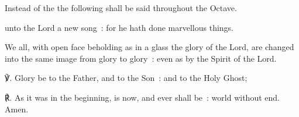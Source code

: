 \mattins

\vspace{-1\baselineskip}

\label{CantateDomino}
{\begin{rubric}
    Instead of the  the following shall be said throughout the Octave.
\end{rubric}}

 unto the Lord a new song~: for he hath done marvellous things. 



We all, with open face beholding as in a glass the glory of the Lord, are changed into the same image from glory to glory~: even as by the Spirit of the Lord. 

℣. Glory be to the Father, and to the Son~: and to the Holy Ghost;\par
℟. As it was in the beginning, is now, and ever shall be~: world without end. Amen.\\


